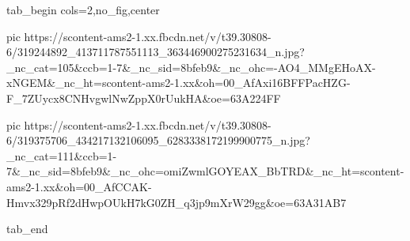  
 
 
 
 


\ifcmt
  tab_begin cols=2,no_fig,center

     pic https://scontent-ams2-1.xx.fbcdn.net/v/t39.30808-6/319244892_413711787551113_363446900275231634_n.jpg?_nc_cat=105&ccb=1-7&_nc_sid=8bfeb9&_nc_ohc=-AO4_MMgEHoAX-xNGEM&_nc_ht=scontent-ams2-1.xx&oh=00_AfAxi16BFFPacHZG-F_7ZUycx8CNHvgwlNwZppX0rUukHA&oe=63A224FF

     pic https://scontent-ams2-1.xx.fbcdn.net/v/t39.30808-6/319375706_434217132106095_6283338172199900775_n.jpg?_nc_cat=111&ccb=1-7&_nc_sid=8bfeb9&_nc_ohc=omiZwmlGOYEAX_BbTRD&_nc_ht=scontent-ams2-1.xx&oh=00_AfCCAK-Hmvx329pRf2dHwpOUkH7kG0ZH_q3jp9mXrW29gg&oe=63A31AB7

  tab_end
\fi
